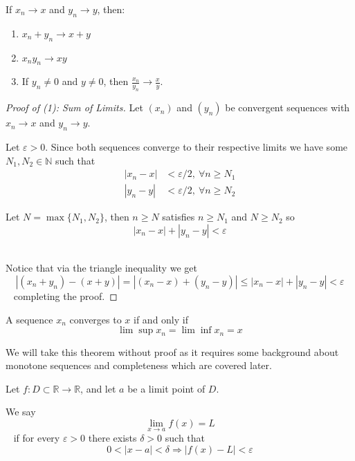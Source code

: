 \newpage 
\begin{thm}
    \label{thm:algebra_limits}
    If $x_n \to x$ and $y_n \to y$, then: 
    \begin{enumerate}
        \item $x_n + y_n \to x + y$ 
        \item $x_ny_n \to xy$
        \item If $y_n \neq 0$ and $y \neq 0$, then $\frac{x_n}{y_n}
            \to \frac{x}{y}$.
    \end{enumerate}
\end{thm}
\begin{proof}[Proof of (1): Sum of Limits]
    Let $(x_n)$ and $(y_n)$ be convergent sequences with 
    $x_n \to x$ and $y_n \to y$. 

    Let $\varepsilon > 0$. Since both sequences converge to their 
    respective limits we have some 
    $N_1, N_2 \in \mathbb N$ such that 
    \begin{align*}
        |x_n - x| &< \varepsilon/2, \: \forall n \geq N_1 \\ 
        |y_n - y| &< \varepsilon/2, \: \forall n \geq N_2
    \end{align*}

    Let $N = \max\{N_1, N_2\}$, then $n \geq N$ satisfies 
    $n \geq N_1$ and $N \geq N_2$ so 
    $$ 
        |x_n - x| + |y_n - y| < \varepsilon
    $$ 

    Notice that via the triangle inequality we get 
    $$ 
        |(x_n + y_n) - (x + y)| = |(x_n - x) + (y_n - y)| 
        \leq |x_n - x| + |y_n - y| < \varepsilon
    $$ 
    completing the proof. 
\end{proof}

\begin{thm}
    A sequence $x_n$ converges to $x$ if and only if 
    $$
        \lim \sup x_n = \lim \inf x_n = x
    $$ 
\end{thm}
We will take this theorem without proof as it requires some background
about monotone sequences and completeness which are covered 
later. 

\begin{defn}
    \label{defn:limit_function}
    Let $f: D \subset \mathbb R \to \mathbb R$, and let 
    $a$ be a limit point of $D$. 

    We say 
    $$ 
        \lim_{x \to a} f(x) = L 
    $$ 
    if for every $\varepsilon > 0$ there exists $\delta > 0$ 
    such that 
    $$ 
        0 < |x - a| < \delta \Rightarrow |f(x) - L| < \varepsilon
    $$ 
\end{defn}

